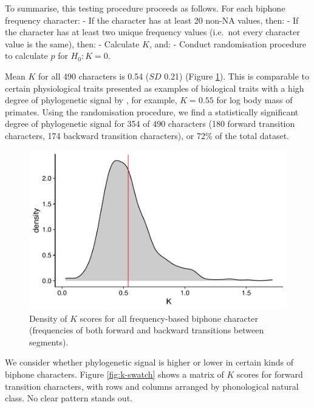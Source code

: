 To summarise, this testing procedure proceeds as follows. For each biphone frequency character:
- If the character has at least 20 non-NA values, then:
- If the character has at least two unique frequency values (i.e.~not every character value is the same), then:
- Calculate \(K\), and:
- Conduct randomisation procedure to calculate \(p\) for \(H_0: K = 0\).

Mean \(K\) for all 490 characters is 0.54 (\(SD\) 0.21) (Figure \ref{fig:k-density}). This is comparable to certain physiological traits presented as examples of biological traits with a high degree of phylogenetic signal by \textcite{blomberg_testing_2003}, for example, \(K=0.55\) for log body mass of primates. Using the \textcite{blomberg_testing_2003} randomisation procedure, we find a statistically significant degree of phylogenetic signal for 354 of 490 characters (180 forward transition characters, 174 backward transition characters), or 72\% of the total dataset.

\begin{figure}

{\centering \includegraphics[width=0.66\linewidth]{05-phylo-signal/fig/k-density} 

}

\caption{Density of $K$ scores for all frequency-based biphone character (frequencies of both forward and backward transitions between segments).}\label{fig:k-density}
\end{figure}

We consider whether phylogenetic signal is higher or lower in certain kinds of biphone characters. Figure \ref{fig:k-swatch} shows a matrix of \(K\) scores for forward transition characters, with rows and columns arranged by phonological natural class. No clear pattern stands out.

